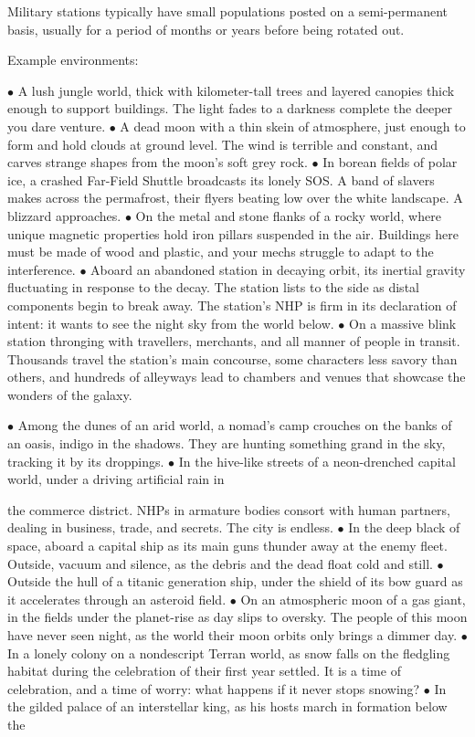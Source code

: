 Military stations typically have small populations posted on a semi-permanent basis, usually for a
period of months or years before being rotated out.


Example environments:


    $\bullet$    A lush jungle world, thick with kilometer-tall trees and layered canopies thick enough to
        support buildings. The light fades to a darkness complete the deeper you dare venture.
    $\bullet$    A dead moon with a thin skein of atmosphere, just enough to form and hold clouds at
        ground level. The wind is terrible and constant, and carves strange shapes from the
        moon's soft grey rock.
    $\bullet$    In borean fields of polar ice, a crashed Far-Field Shuttle broadcasts its lonely SOS. A band
        of slavers makes across the permafrost, their flyers beating low over the white landscape.
        A blizzard approaches.
    $\bullet$    On the metal and stone flanks of a rocky world, where unique magnetic properties hold
        iron pillars suspended in the air. Buildings here must be made of wood and plastic, and
        your mechs struggle to adapt to the interference.
    $\bullet$    Aboard an abandoned station in decaying orbit, its inertial gravity fluctuating in response
        to the decay. The station lists to the side as distal components begin to break away. The
        station's NHP is firm in its declaration of intent: it wants to see the night sky from the
        world below.
    $\bullet$    On a massive blink station thronging with travellers, merchants, and all manner of people
        in transit. Thousands travel the station's main concourse, some characters less savory
        than others, and hundreds of alleyways lead to chambers and venues that showcase the
        wonders of the galaxy.




$\bullet$    Among the dunes of an arid world, a nomad's camp crouches on the banks of an oasis,
    indigo in the shadows. They are hunting something grand in the sky, tracking it by its
    droppings.
$\bullet$    In the hive-like streets of a neon-drenched capital world, under a driving artificial rain in

    the commerce district. NHPs in armature bodies consort with human partners, dealing in
    business, trade, and secrets. The city is endless.
$\bullet$    In the deep black of space, aboard a capital ship as its main guns thunder away at the
    enemy fleet. Outside, vacuum and silence, as the debris and the dead float cold and still.
$\bullet$    Outside the hull of a titanic generation ship, under the shield of its bow guard as it
    accelerates through an asteroid field.
$\bullet$    On an atmospheric moon of a gas giant, in the fields under the planet-rise as day slips to
    oversky. The people of this moon have never seen night, as the world their moon orbits
    only brings a dimmer day.
$\bullet$    In a lonely colony on a nondescript Terran world, as snow falls on the fledgling habitat
    during the celebration of their first year settled. It is a time of celebration, and a time of
    worry: what happens if it never stops snowing?
$\bullet$    In the gilded palace of an interstellar king, as his hosts march in formation below the

